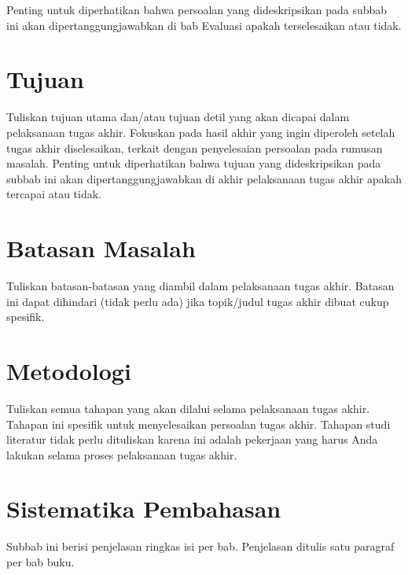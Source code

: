 Penting untuk diperhatikan bahwa persoalan yang dideskripsikan pada subbab ini akan dipertanggungjawabkan di bab Evaluasi apakah terselesaikan atau tidak.

\blindtext

\section{Tujuan}

Tuliskan tujuan utama dan/atau tujuan detil yang akan dicapai dalam pelaksanaan tugas akhir. Fokuskan pada hasil akhir yang ingin diperoleh setelah tugas akhir diselesaikan, terkait dengan penyelesaian persoalan pada rumusan masalah. Penting untuk diperhatikan bahwa tujuan yang dideskripsikan pada subbab ini akan dipertanggungjawabkan di akhir pelaksanaan tugas akhir apakah tercapai atau tidak.

\blindtext

\section{Batasan Masalah}

Tuliskan batasan-batasan yang diambil dalam pelaksanaan tugas akhir. Batasan ini dapat dihindari (tidak perlu ada) jika topik/judul tugas akhir dibuat cukup spesifik.

\blindtext

\section{Metodologi}

Tuliskan semua tahapan yang akan dilalui selama pelaksanaan tugas akhir. Tahapan ini spesifik untuk menyelesaikan persoalan tugas akhir. Tahapan studi literatur tidak perlu dituliskan karena ini adalah pekerjaan yang harus Anda lakukan selama proses pelaksanaan tugas akhir.

\blindtext

\section{Sistematika Pembahasan}

Subbab ini berisi penjelasan ringkas isi per bab. Penjelasan ditulis satu paragraf per bab buku.

\blindtext

